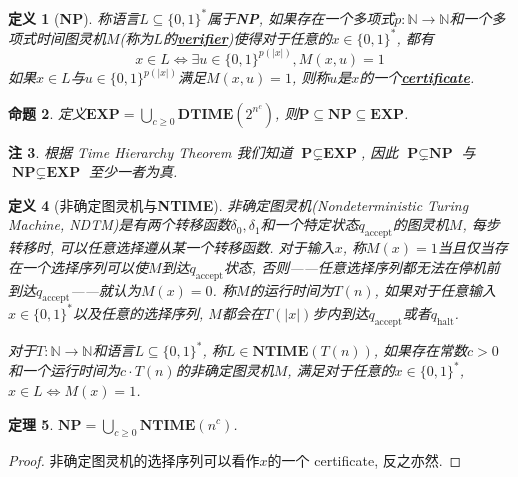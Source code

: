 \documentclass[8pt]{article}
\theoremstyle{compact}
\newtheorem{theorem}{定理}[section]
\newtheorem{definition}[theorem]{定义}
\newtheorem{proposition}[theorem]{命题}
\newtheorem{remark}[theorem]{注}
\def\obj#1{\textbf{\uline{#1}}}
\def\ge{\geqslant}
\def\DTIME{\textbf{DTIME}}
\def\NTIME{\textbf{NTIME}}
\def\P{\textbf{P}}
\def\NP{\textbf{NP}}
\def\EXP{\textbf{EXP}}
\begin{document}
\begin{definition}[\NP]
	称语言$L \subseteq \{0, 1\}^*$属于\NP, 如果存在一个多项式$p: \mathbb N \to \mathbb N$和一个多项式时间图灵机$M$(称为$L$的\obj{verifier})使得对于任意的$x \in \{0, 1\}^*$, 都有
	$$x \in L \Leftrightarrow \exists u \in \{0, 1\}^{p(|x|)}, M(x, u) = 1$$
	如果$x \in L$与$u \in \{0, 1\}^{p(|x|)}$满足$M(x, u) = 1$, 则称$u$是$x$的一个\obj{certificate}. 
\end{definition}
\begin{proposition}
	定义$\EXP = \bigcup_{c \ge 0} \DTIME(2^{n^c})$, 则$\P \subseteq \NP \subseteq \EXP$. 
\end{proposition}
\begin{remark}
	根据 Time Hierarchy Theorem 我们知道 $\P \subsetneq \EXP$, 因此 $\P \subsetneq \NP$ 与 $\NP \subsetneq \EXP$ 至少一者为真.
\end{remark}
\begin{definition}[非确定图灵机与\NTIME]
	非确定图灵机(Nondeterministic Turing Machine, NDTM)是有两个转移函数$\delta_0, \delta_1$和一个特定状态$q_{\text{accept}}$的图灵机$M$, 每步转移时, 可以任意选择遵从某一个转移函数. 对于输入$x$, 称$M(x) = 1$当且仅当存在一个选择序列可以使$M$到达$q_{\text{accept}}$状态, 否则——任意选择序列都无法在停机前到达$q_{\text{accept}}$——就认为$M(x) = 0$. 称$M$的运行时间为$T(n)$, 如果对于任意输入$x \in \{0, 1\}^*$以及任意的选择序列, $M$都会在$T(|x|)$步内到达$q_{\text{accept}}$或者$q_{\text{halt}}$. 

	对于$T: \mathbb N \to \mathbb N$和语言$L \subseteq \{0, 1\}^*$, 称$L \in \NTIME(T(n))$, 如果存在常数$c > 0$和一个运行时间为$c \cdot T(n)$的非确定图灵机$M$, 满足对于任意的$x \in \{0, 1\}^*$, $x \in L \Leftrightarrow M(x) = 1$. 
\end{definition}
\begin{theorem}
	$\NP = \bigcup_{c \ge 0} \NTIME(n^c)$. 
\end{theorem}
\begin{proof}
	非确定图灵机的选择序列可以看作$x$的一个 certificate, 反之亦然. 
\end{proof}
\end{document}
